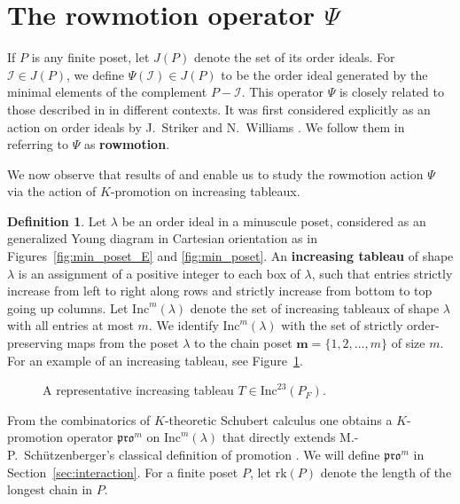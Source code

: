 \documentclass[12pt]{amsart}
\theoremstyle{definition}
\newtheorem{definition}[theorem]{Definition}
\theoremstyle{remark}
\numberwithin{equation}{section}
\newcommand{\inc}{\ensuremath{\mathrm{Inc}}}
\newcommand{\pro}{\mathfrak{pro}}
\newcommand{\rank}{\ensuremath{\mathrm{rk}}}
\newcommand{\uu}{\mathcal{I}}
\begin{document}
\section{The rowmotion operator $\Psi$}\label{sec:rowmotion}

If $P$ is any finite poset, let $J(P)$ denote the set of its order ideals. For $\uu \in J(P)$, we define $\Psi(\uu) \in J(P)$ to be the order ideal generated by the minimal elements of the complement $P - \uu$. This operator $\Psi$ is closely related to those described in \cite{Brouwer.Schrijver,Duchet,Cameron.Fonderflaass} in different contexts. It was first considered explicitly as an action on order ideals by J.~Striker and N.~Williams \cite{Striker.Williams}. We follow them in referring to $\Psi$ as {\bf rowmotion}.

We now observe that results of \cite{DPS} and \cite{Dilks.Striker.Vorland} enable us to study the rowmotion action $\Psi$ via the action of $K$-promotion on increasing tableaux.

\begin{definition}
Let $\lambda$ be an order ideal in a minuscule poset, considered as an generalized Young diagram in Cartesian orientation as in Figures~\ref{fig:min_poset_E} and \ref{fig:min_poset}. An {\bf increasing tableau} of shape $\lambda$ is an assignment of a positive integer to each box of $\lambda$, such that entries strictly increase from left to right along rows and strictly increase from bottom to top going up columns. Let $\inc^m(\lambda)$ denote the set of increasing tableaux of shape $\lambda$ with all entries at most $m$. We identify $\inc^m(\lambda)$ with the set of strictly order-preserving maps from the poset $\lambda$ to the chain poset $\mathbf{m} = \{1, 2, \dots, m\}$ of size $m$. For an example of an increasing tableau, see Figure~\ref{fig:inctab}.
\end{definition}

\begin{figure}[h]
\caption{A representative increasing tableau $T \in \inc^{23}(P_F)$.}\label{fig:inctab}
\end{figure}

From the combinatorics of $K$-theoretic Schubert calculus one obtains a $K$-promotion operator $\pro^m$ on $\inc^m(\lambda)$ that directly extends M.-P.~Sch\"utzenberger's classical definition of promotion \cite{Schutzenberger:promotion}. We will define $\pro^m$ in Section~\ref{sec:interaction}. For a finite poset $P$, let $\rank(P)$ denote the length of the longest chain in $P$.
\end{document}
